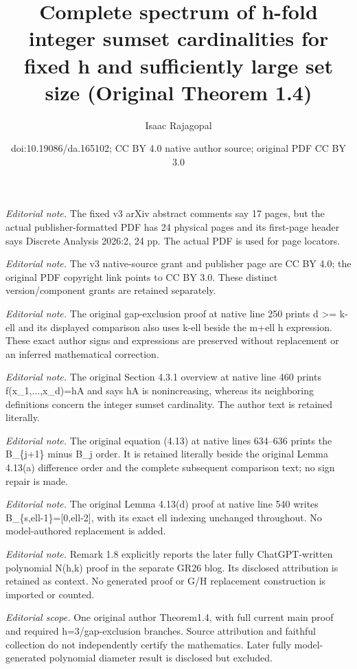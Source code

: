\documentclass[10pt,a4paper]{article}
\title{Complete spectrum of h-fold integer sumset cardinalities for fixed h and sufficiently large set size (Original Theorem 1.4)}
\author{Isaac Rajagopal}
\date{doi:10.19086/da.165102; CC BY 4.0 native author source; original PDF CC BY 3.0}
\theoremstyle{definition}
\theoremstyle{remark}
\numberwithin{equation}{section}
\numberwithin{theorem}{section}
\begin{document}
\maketitle
\noindent\textit{Editorial note.} The fixed v3 arXiv abstract comments say 17 pages, but the actual publisher-formatted PDF has 24 physical pages and its first-page header says Discrete Analysis 2026:2, 24 pp. The actual PDF is used for page locators.\par\medskip
\noindent\textit{Editorial note.} The v3 native-source grant and publisher page are CC BY 4.0; the original PDF copyright link points to CC BY 3.0. These distinct version/component grants are retained separately.\par\medskip
\noindent\textit{Editorial note.} The original gap-exclusion proof at native line 250 prints d >= k-ell and its displayed comparison also uses k-ell beside the m+ell h expression. These exact author signs and expressions are preserved without replacement or an inferred mathematical correction.\par\medskip
\noindent\textit{Editorial note.} The original Section 4.3.1 overview at native line 460 prints f(x\_1,...,x\_d)=hA and says hA is nonincreasing, whereas its neighboring definitions concern the integer sumset cardinality. The author text is retained literally.\par\medskip
\noindent\textit{Editorial note.} The original equation (4.13) at native lines 634–636 prints the B\_\{j+1\} minus B\_j order. It is retained literally beside the original Lemma 4.13(a) difference order and the complete subsequent comparison text; no sign repair is made.\par\medskip
\noindent\textit{Editorial note.} The original Lemma 4.13(d) proof at native line 540 writes B\_\{s,ell-1\}=[0,ell-2], with its exact ell indexing unchanged throughout. No model-authored replacement is added.\par\medskip
\noindent\textit{Editorial note.} Remark 1.8 explicitly reports the later fully ChatGPT-written polynomial N(h,k) proof in the separate GR26 blog. Its disclosed attribution is retained as context. No generated proof or G/H replacement construction is imported or counted.\par\medskip
\noindent\textit{Editorial scope.} One original author Theorem1.4, with full current main proof and required h=3/gap-exclusion branches. Source attribution and faithful collection do not independently certify the mathematics. Later fully model-generated polynomial diameter result is disclosed but excluded.\par\medskip
\end{document}

